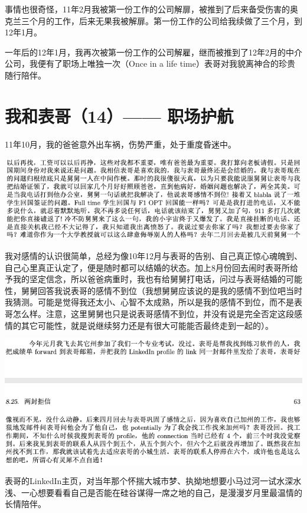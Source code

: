 \documentclass[9pt, b5paper]{article}
\begin{document}
事情也很奇怪，11年2月我被第一份工作的公司解扉，被推到了后来备受伤害的奥克兰三个月的工作，后来无果我被解扉。第一份工作的公司给我续做了三个月，到12年1月。

一年后的12年1月，我再次被第一份工作的公司解雇，继而被推到了12年2月的中介公司，我便有了职场上唯独一次（Once in a life time）表哥对我貌离神合的珍贵随行陪伴。

\section{我和表哥（14）—— 职场护航}
\label{sec:orgb2742f8}

11年10月，我的爸爸意外出车祸，伤势严重，处于重度昏迷中。 

\begin{center}
\includegraphics[width=.9\linewidth]{./pic/p1p76.png}
\end{center}

我对感情的认识很简单，总经为像10年12月与表哥的告别、自己真正惊心魂魄到、自己心里真正认定了，便是随时都可以结婚的状态。加上8月份回去闹时表哥所给予我的坚定信念，所以爸爸病重时，我也有给舅舅打电话，问过与表哥结婚的可能性，舅舅回答我说表哥的感情不到位（我想舅舅应该说的是我的感情不到位吧当时我猜测。可能是觉得我还太小、心智不太成熟，所以是我的感情不到位，而不是表哥怎么样。注意，这里舅舅也只是说表哥感情不到位，并没有说是完全否定这段感情的其它可能性，就是说继续努力还是有很大可能能否最终走到一起的）。

\begin{center}
\includegraphics[width=.9\linewidth]{./pic/p1p63-1.png}
\end{center}

表哥的LinkedIn主页，对当年那个怀揣大城市梦、执拗地想要小马过河一试水深水浅、一心想要看看自己是否能在硅谷谋得一席之地的自己，是漫漫岁月里最温情的长情陪伴。
\end{document}
